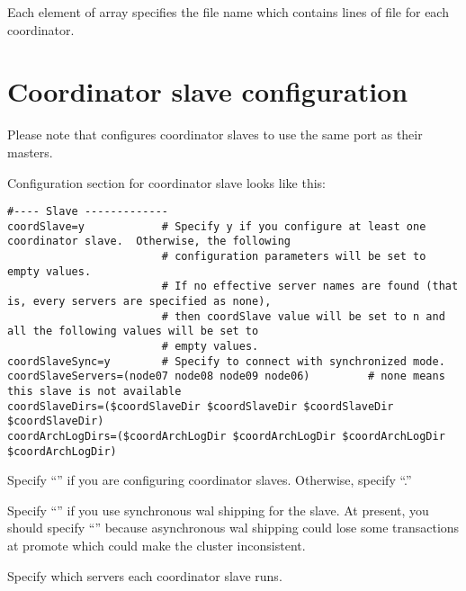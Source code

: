       Each element of  array specifies the file name which contains
	  lines of  file for each coordinator.



\section{Coordinator slave configuration}

  Please note that  configures coordinator slaves to use the same port as their masters.
  
  Configuration section for coordinator slave looks like this:
  
  
  \begin{lstlisting}[frame=single]
#---- Slave -------------
coordSlave=y            # Specify y if you configure at least one coordinator slave.  Otherwise, the following
                        # configuration parameters will be set to empty values.
                        # If no effective server names are found (that is, every servers are specified as none),
                        # then coordSlave value will be set to n and all the following values will be set to
                        # empty values.
coordSlaveSync=y        # Specify to connect with synchronized mode.
coordSlaveServers=(node07 node08 node09 node06)         # none means this slave is not available
coordSlaveDirs=($coordSlaveDir $coordSlaveDir $coordSlaveDir $coordSlaveDir)
coordArchLogDirs=($coordArchLogDir $coordArchLogDir $coordArchLogDir $coordArchLogDir)
  \end{lstlisting}
  
  
      Specify ``'' if you are configuring coordinator slaves.
      Otherwise, specify ``.''
  
  
      Specify ``'' if you use synchronous wal shipping for the slave.
      At present, you should specify ``'' because asynchronous wal shipping could lose some
	  transactions at promote which could make the cluster inconsistent.
  
  
      Specify which servers each coordinator slave runs.
  
